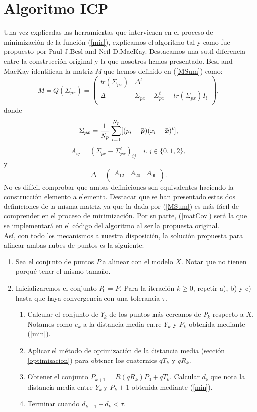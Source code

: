 \section{Algoritmo ICP}\label{algICP}
Una vez explicadas las herramientas que intervienen en el proceso de minimización de la función (\ref{min}), explicamos el algoritmo tal y como fue propuesto por Paul J.Besl and Neil D.MacKay. Destacamos una sutil diferencia entre la construcción original y la que nosotros hemos presentado. Besl and MacKay identifican la matriz $ M $ que hemos definido en (\ref{MSum}) como:
\begin{equation}\label{matCov}
M = Q(\Sigma_{px}) =
 \begin{pmatrix}
tr(\Sigma_{px}) & \Delta^t \\
\Delta & \Sigma_{px} + \Sigma_{px}^t + tr(\Sigma_{px})I_3\\
\end{pmatrix}, 
\end{equation}
donde 
\[
\Sigma_{px} = \frac{1}{N_p}\sum_{i=1}^{N_p} \lbrack (p_i-\bar{\textbf{\emph{p}}})(x_i - \bar{\textbf{\emph{x}}})^t\rbrack, \]
\[A_{ij} = (\Sigma_{px}-\Sigma_{px}^t)_{ij} \quad i,j \in \lbrace 0,1,2 \rbrace,\]
y 
\[\Delta = \begin{pmatrix}
A_{12} & A_{20} & A_{01}  \\
\end{pmatrix}. \]
No es difícil comprobar que ambas definiciones son equivalentes haciendo la construcción elemento a elemento. Destacar que se han presentado estas dos definiciones de la misma matriz, ya que la dada por (\ref{MSum}) es más fácil de comprender en el proceso de minimización. Por su parte, (\ref{matCov}) será la que se implementará en el código del algoritmo al ser la propuesta original. \\

Así, con todo los mecanismos a nuestra disposición, la solución propuesta para alinear ambas nubes de puntos es la siguiente:
\begin{enumerate}
\item Sea el conjunto de puntos $ P $ a alinear con el modelo $ X $. Notar que no tienen porqué tener el mismo tamaño.
\item Inicializaremos el conjunto $ P_0 = P $. Para la iteración $ k \geq 0$, repetir a), b) y c) hasta que haya convergencia con una tolerancia $ \tau $.
\begin{enumerate}
	\item Calcular el conjunto de $ Y_k  $ de los puntos más cercanos de $ P_k $ respecto a $ X $. Notamos como $ e_{k} $ a la distancia media entre $ Y_k  $ y $ P_k  $ obtenida mediante (\ref{min}).
	\item Aplicar el método de optimización de la distancia media (sección \ref{optimizacion}) para obtener los cuaternios $ qT_{k} $ y $ qR_{k} $. 
	\item Obtener el conjunto $ P_{k+1} = R(qR_{k})P_0 + qT_{k} $. Calcular $ d_k $ que nota la distancia media entre $ Y_k  $ y $ P_k+1  $ obtenida mediante (\ref{min}).
	\item Terminar cuando $ d_{k-1} - d_k < \tau $.
\end{enumerate}
\end{enumerate}

